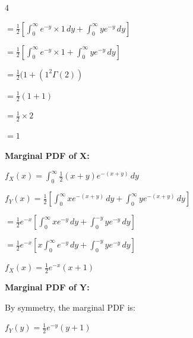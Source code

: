 \documentclass[12 pt]{article}
\begin{document}
\begin{exercise}{4}
\begin{enumerate}
        $= \frac{1}{2}[\int_{0}^{\infty} e^{-y} \times 1 \, dy + \int_{0}^{\infty} ye^{-y} \, dy]$

        $= \frac{1}{2}[\int_{0}^{\infty} e^{-y} \times 1 + \int_{0}^{\infty} ye^{-y} \, dy]$

        $= \frac{1}{2}(1 + (1^2 \Gamma(2))$

        $= \frac{1}{2}(1+1)$

        $= \frac{1}{2} \times 2$

        $= 1$
    \end{enumerate}

    \textbf{Marginal PDF of X:}

    $f_X(x) = \int_0^{\infty} \frac{1}{2} (x+y) e^{-(x+y)} \, dy$

    $f_Y(x) = \frac{1}{2}[\int_{0}^{\infty} x e^{-(x+y)} \, dy + \int_{0}^{\infty}y e^{-(x+y)} \, dy]$

    $= \frac{1}{2} e^{-x} [\int_{0}^{\infty} xe^{-y} \, dy + \int_{0}^{-y}ye^{-y} \, dy]$

    $= \frac{1}{2} e^{-x} [x \int_{0}^{\infty} e^{-y} \, dy + \int_{0}^{-y}ye^{-y} \, dy]$

    $f_X(x) = \frac{1}{2}e^{-x}(x+1)$

    \hfill

    \textbf{Marginal PDF of Y:}

    By symmetry, the marginal PDF is:

    $f_Y(y) = \frac{1}{2} e^{-y}(y+1)$

    \hfill
    \end{exercise}
\end{document}
